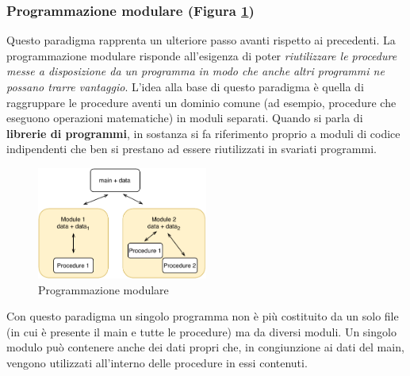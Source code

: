 \subsubsection{Programmazione modulare (Figura \ref{fig:modular-programming})}
Questo paradigma rapprenta un ulteriore passo avanti rispetto ai precedenti. La programmazione modulare risponde all'esigenza di poter \textit{riutilizzare le procedure messe a disposizione da un programma in modo che anche altri programmi ne possano trarre vantaggio}. L’idea alla base di questo paradigma è quella di raggruppare le procedure aventi un dominio comune (ad esempio, procedure che eseguono operazioni matematiche) in moduli separati. Quando si parla di \textbf{librerie di programmi}, in sostanza si fa riferimento proprio a moduli di codice indipendenti che ben si prestano ad essere riutilizzati in svariati programmi.
\begin{figure}[H]
    \centering
    \includegraphics[width=0.50\textwidth]{images/01_3_modular_programming.pdf}
    \caption{Programmazione modulare}
    \label{fig:modular-programming}
\end{figure}
Con questo paradigma un singolo programma non è più costituito da un solo file (in cui è presente il main e tutte le procedure) ma da diversi moduli. Un singolo modulo può contenere anche dei dati propri che, in congiunzione ai dati del main, vengono utilizzati all’interno delle procedure in essi contenuti.

